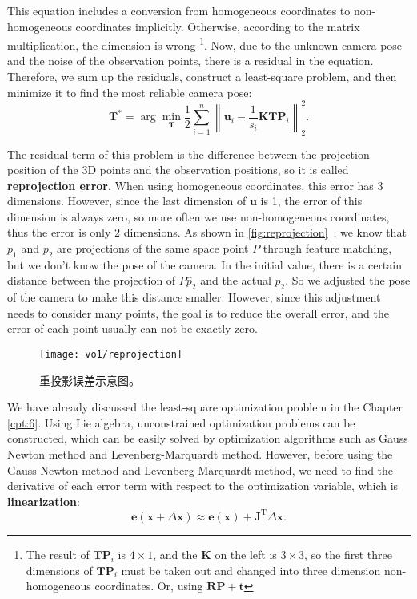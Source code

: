 This equation includes a conversion from homogeneous coordinates to non-homogeneous coordinates implicitly. Otherwise, according to the matrix multiplication, the dimension is wrong \footnote{The result of $ \mathbf{T} {\mathbf{P}_i}$ is $4 \times 1$, and the $\mathbf{K}$ on the left is $3 \times 3$, so the first three dimensions of $\mathbf{T}\mathbf{P}_i$ must be taken out and changed into three dimension non-homogeneous coordinates. Or, using $\mathbf{R}\mathbf{P}+\mathbf{t}$}. Now, due to the unknown camera pose and the noise of the observation points, there is a residual in the equation. Therefore, we sum up the residuals, construct a least-square problem, and then minimize it to find the most reliable camera pose:
\begin{equation}
{\mathbf{T}^*} = \arg \mathop {\min }\limits_{\mathbf{T}}  \frac{1}{2}\sum\limits_{i = 1}^n {\left\| {{{\mathbf{u}}_i} - \frac{1}{s_i} \mathbf{K}\mathbf{T}{\mathbf{P}}_i} \right\|_2^2} .
\end{equation}

The residual term of this problem is the difference between the projection position of the 3D points and the observation positions, so it is called \textbf{reprojection error}. When using homogeneous coordinates, this error has 3 dimensions. However, since the last dimension of ${\mathbf{u}}$ is 1, the error of this dimension is always zero, so more often we use non-homogeneous coordinates, thus the error is only 2 dimensions. As shown in \autoref{fig:reprojection}~, we know that $p_1$ and $p_2$ are projections of the same space point $P$ through feature matching, but we don't know the pose of the camera. In the initial value, there is a certain distance between the projection of $P \hat{p}_2$ and the actual $p_2$. So we adjusted the pose of the camera to make this distance smaller. However, since this adjustment needs to consider many points, the goal is to reduce the overall error, and the error of each point usually can not be exactly zero.

\begin{figure}[!htp]
	\centering
	\texttt{[image: vo1/reprojection]}
	\caption{重投影误差示意图。}
	\label{fig:reprojection}
\end{figure}

We have already discussed the least-square optimization problem in the Chapter \ref{cpt:6}. Using Lie algebra, unconstrained optimization problems can be constructed, which can be easily solved by optimization algorithms such as Gauss Newton method and Levenberg-Marquardt method. However, before using the Gauss-Newton method and Levenberg-Marquardt method, we need to find the derivative of each error term with respect to the optimization variable, which is \textbf{linearization}:
\begin{equation}
\mathbf{e}( \mathbf{x} + \Delta \mathbf{x} ) \approx \mathbf{e}(\mathbf{x}) + \mathbf{J} ^\mathrm{T}\Delta \mathbf{x}.
\end{equation}

